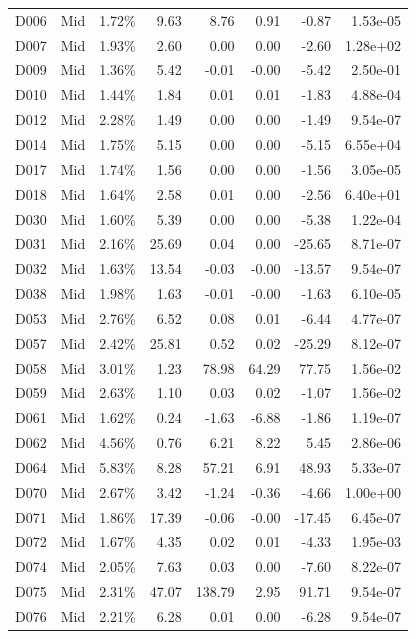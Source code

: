 \begin{tabular}{l l r r r r r r}
D006 & Mid & 1.72\% & 9.63 & 8.76 & 0.91 & -0.87 & 1.53e-05 \\
D007 & Mid & 1.93\% & 2.60 & 0.00 & 0.00 & -2.60 & 1.28e+02 \\
D009 & Mid & 1.36\% & 5.42 & -0.01 & -0.00 & -5.42 & 2.50e-01 \\
D010 & Mid & 1.44\% & 1.84 & 0.01 & 0.01 & -1.83 & 4.88e-04 \\
D012 & Mid & 2.28\% & 1.49 & 0.00 & 0.00 & -1.49 & 9.54e-07 \\
D014 & Mid & 1.75\% & 5.15 & 0.00 & 0.00 & -5.15 & 6.55e+04 \\
D017 & Mid & 1.74\% & 1.56 & 0.00 & 0.00 & -1.56 & 3.05e-05 \\
D018 & Mid & 1.64\% & 2.58 & 0.01 & 0.00 & -2.56 & 6.40e+01 \\
D030 & Mid & 1.60\% & 5.39 & 0.00 & 0.00 & -5.38 & 1.22e-04 \\
D031 & Mid & 2.16\% & 25.69 & 0.04 & 0.00 & -25.65 & 8.71e-07 \\
D032 & Mid & 1.63\% & 13.54 & -0.03 & -0.00 & -13.57 & 9.54e-07 \\
D038 & Mid & 1.98\% & 1.63 & -0.01 & -0.00 & -1.63 & 6.10e-05 \\
D053 & Mid & 2.76\% & 6.52 & 0.08 & 0.01 & -6.44 & 4.77e-07 \\
D057 & Mid & 2.42\% & 25.81 & 0.52 & 0.02 & -25.29 & 8.12e-07 \\
D058 & Mid & 3.01\% & 1.23 & 78.98 & 64.29 & 77.75 & 1.56e-02 \\
D059 & Mid & 2.63\% & 1.10 & 0.03 & 0.02 & -1.07 & 1.56e-02 \\
D061 & Mid & 1.62\% & 0.24 & -1.63 & -6.88 & -1.86 & 1.19e-07 \\
D062 & Mid & 4.56\% & 0.76 & 6.21 & 8.22 & 5.45 & 2.86e-06 \\
D064 & Mid & 5.83\% & 8.28 & 57.21 & 6.91 & 48.93 & 5.33e-07 \\
D070 & Mid & 2.67\% & 3.42 & -1.24 & -0.36 & -4.66 & 1.00e+00 \\
D071 & Mid & 1.86\% & 17.39 & -0.06 & -0.00 & -17.45 & 6.45e-07 \\
D072 & Mid & 1.67\% & 4.35 & 0.02 & 0.01 & -4.33 & 1.95e-03 \\
D074 & Mid & 2.05\% & 7.63 & 0.03 & 0.00 & -7.60 & 8.22e-07 \\
D075 & Mid & 2.31\% & 47.07 & 138.79 & 2.95 & 91.71 & 9.54e-07 \\
D076 & Mid & 2.21\% & 6.28 & 0.01 & 0.00 & -6.28 & 9.54e-07 \\

\end{tabular}
